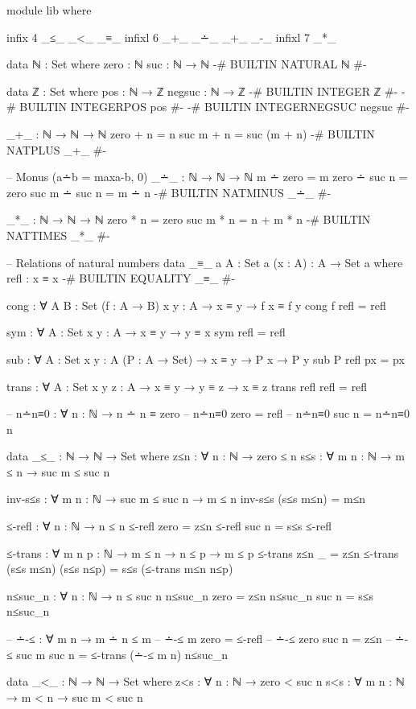 \documentclass{article}
\begin{document}
\begin{code}
module lib where

infix 4 _≤_ _<_ _≡_
infixl 6 _+_ _∸_ _+_ _-_
infixl 7 _*_

data ℕ : Set where
    zero : ℕ
    suc : ℕ → ℕ
{-# BUILTIN NATURAL ℕ #-}

data ℤ : Set where
    pos : ℕ → ℤ
    negsuc : ℕ → ℤ
{-# BUILTIN INTEGER       ℤ    #-}
{-# BUILTIN INTEGERPOS    pos    #-}
{-# BUILTIN INTEGERNEGSUC negsuc #-}

_+_ : ℕ → ℕ → ℕ
zero + n = n
suc m + n = suc (m + n)
{-# BUILTIN NATPLUS _+_ #-}

-- Monus (a∸b = max{a-b, 0})
_∸_ : ℕ → ℕ → ℕ
m ∸ zero = m
zero ∸ suc n = zero
suc m ∸ suc n = m ∸ n
{-# BUILTIN NATMINUS _∸_ #-}

_*_ : ℕ → ℕ → ℕ
zero * n = zero
suc m * n = n + m * n
{-# BUILTIN NATTIMES _*_ #-}

-- Relations of natural numbers
data _≡_ {a} {A : Set a} (x : A) : A → Set a where
  refl : x ≡ x
{-# BUILTIN EQUALITY _≡_  #-}

cong : ∀ {A B : Set} (f : A → B) {x y : A} → x ≡ y → f x ≡ f y
cong f refl = refl

sym : ∀ {A : Set} {x y : A} → x ≡ y → y ≡ x
sym refl = refl

sub : ∀ {A : Set} {x y : A} (P : A → Set) → x ≡ y → P x → P y
sub P refl px = px

trans : ∀ {A : Set} {x y z : A} → x ≡ y → y ≡ z → x ≡ z
trans refl refl = refl

-- n∸n≡0 : ∀ {n : ℕ} → n ∸ n ≡ zero
-- n∸n≡0 {zero} = refl
-- n∸n≡0 {suc n} = n∸n≡0 {n}

data _≤_ : ℕ → ℕ → Set where
    z≤n : ∀ {n : ℕ} → zero ≤ n
    s≤s : ∀ {m n : ℕ} → m ≤ n → suc m ≤ suc n

inv-s≤s : ∀ {m n : ℕ} → suc m ≤ suc n → m ≤ n
inv-s≤s (s≤s m≤n) = m≤n

≤-refl : ∀ {n : ℕ} → n ≤ n
≤-refl {zero} = z≤n
≤-refl {suc n} = s≤s ≤-refl

≤-trans : ∀ {m n p : ℕ} → m ≤ n → n ≤ p → m ≤ p
≤-trans z≤n _ = z≤n
≤-trans (s≤s m≤n) (s≤s n≤p) = s≤s (≤-trans m≤n n≤p)

n≤suc_n : ∀ {n : ℕ} → n ≤ suc n
n≤suc_n {zero} = z≤n
n≤suc_n {suc n} = s≤s n≤suc_n

-- ∸-≤ : ∀ {m n} → m ∸ n ≤ m
-- ∸-≤ {m} {zero} = ≤-refl
-- ∸-≤ {zero} {suc n} = z≤n
-- ∸-≤ {suc m} {suc n} = ≤-trans (∸-≤ {m} {n}) n≤suc_n

data _<_ : ℕ → ℕ → Set where
    z<s : ∀ {n : ℕ} → zero < suc n
    s<s : ∀ {m n : ℕ} → m < n → suc m < suc n


\end{code}
\end{document}
